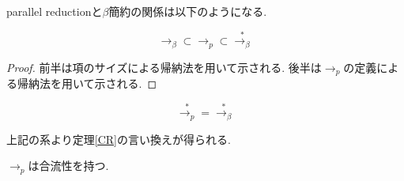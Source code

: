 \documentclass{ltjsarticle}
\begin{document}
parallel reductionと$\beta$簡約の関係は以下のようになる.

\begin{lem}
 \[
 \rightarrow_{\beta} \subset \rightarrow_{p} \subset \overset{*}{\rightarrow_{\beta}}
 \]
\end{lem}

\begin{proof}
 前半は項のサイズによる帰納法を用いて示される. 後半は$\rightarrow_{p}$の定義による帰納法を用いて示される.
\end{proof}

\begin{cor}
 \[
\overset{*}{\rightarrow_{p}} = \overset{*}{\rightarrow_{\beta}}
 \]
\end{cor}

上記の系より定理\ref{CR}の言い換えが得られる.

\begin{thm}\label{CR'}
 $\rightarrow_{p}$は合流性を持つ.
\end{thm}
\end{document}
